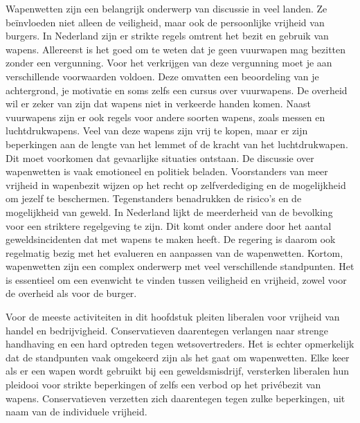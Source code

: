 \documentclass[
  a5paper,
  smalldemyvopaper,10pt,twoside,onecolumn,openright,extrafontsizes,hidelinks]{memoir}
\begin{document}
Wapenwetten zijn een belangrijk onderwerp van discussie in veel landen.
Ze beïnvloeden niet alleen de veiligheid, maar ook de persoonlijke
vrijheid van burgers. In Nederland zijn er strikte regels omtrent het
bezit en gebruik van wapens. Allereerst is het goed om te weten dat je
geen vuurwapen mag bezitten zonder een vergunning. Voor het verkrijgen
van deze vergunning moet je aan verschillende voorwaarden voldoen. Deze
omvatten een beoordeling van je achtergrond, je motivatie en soms zelfs
een cursus over vuurwapens. De overheid wil er zeker van zijn dat wapens
niet in verkeerde handen komen. Naast vuurwapens zijn er ook regels voor
andere soorten wapens, zoals messen en luchtdrukwapens. Veel van deze
wapens zijn vrij te kopen, maar er zijn beperkingen aan de lengte van
het lemmet of de kracht van het luchtdrukwapen. Dit moet voorkomen dat
gevaarlijke situaties ontstaan. De discussie over wapenwetten is vaak
emotioneel en politiek beladen. Voorstanders van meer vrijheid in
wapenbezit wijzen op het recht op zelfverdediging en de mogelijkheid om
jezelf te beschermen. Tegenstanders benadrukken de risico's en de
mogelijkheid van geweld. In Nederland lijkt de meerderheid van de
bevolking voor een striktere regelgeving te zijn. Dit komt onder andere
door het aantal geweldsincidenten dat met wapens te maken heeft. De
regering is daarom ook regelmatig bezig met het evalueren en aanpassen
van de wapenwetten. Kortom, wapenwetten zijn een complex onderwerp met
veel verschillende standpunten. Het is essentieel om een evenwicht te
vinden tussen veiligheid en vrijheid, zowel voor de overheid als voor de
burger.

Voor de meeste activiteiten in dit hoofdstuk pleiten liberalen voor
vrijheid van handel en bedrijvigheid. Conservatieven daarentegen
verlangen naar strenge handhaving en een hard optreden tegen
wetsovertreders. Het is echter opmerkelijk dat de standpunten vaak
omgekeerd zijn als het gaat om wapenwetten. Elke keer als er een wapen
wordt gebruikt bij een geweldsmisdrijf, versterken liberalen hun
pleidooi voor strikte beperkingen of zelfs een verbod op het privébezit
van wapens. Conservatieven verzetten zich daarentegen tegen zulke
beperkingen, uit naam van de individuele vrijheid.
\end{document}
